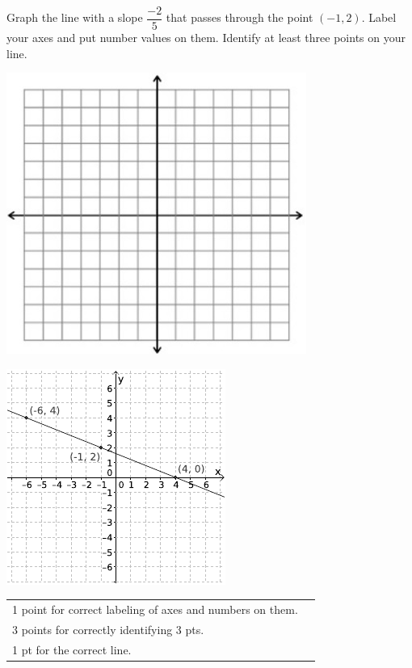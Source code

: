 {
	Graph the line with a slope $\dfrac{-2}{5}$ that passes through the point $(-1, 2)$. Label your axes and put number values on them. Identify at least three points on your line.\begin{onlyproblem}\begin{center}\includegraphics{fig-graphpaper.png}\end{center}\end{onlyproblem} \begin{onlysolution}\begin{center}\includegraphics{fig095-08-d-answer}\end{center}\end{onlysolution}
}
{
	\begin{tabular}{l r}
	1 point for correct labeling of axes and numbers on them.\\
	3 points for correctly identifying 3 pts.\\
	1 pt for the correct line.\\
	\end{tabular}
}
